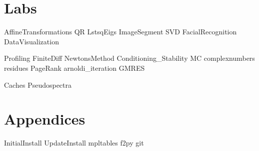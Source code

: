\documentclass[nociteref]{SIAM-GH-book}
\begin{document}
\part{Labs}
{AffineTransformations}
{QR}
{LstsqEigs}
{ImageSegment}
{SVD}
{FacialRecognition}
{DataVisualization}

{Profiling}
{FiniteDiff}
{NewtonsMethod}
{Conditioning_Stability}
{MC}
{complexnumbers}
{residues}
{PageRank}
{arnoldi_iteration}
{GMRES}



{Caches}
{Pseudospectra}


\part{Appendices}
\begin{appendices}
{InitialInstall}
{UpdateInstall}
{mpltables}
{f2py}
{git}
\end{appendices}
\end{document}
